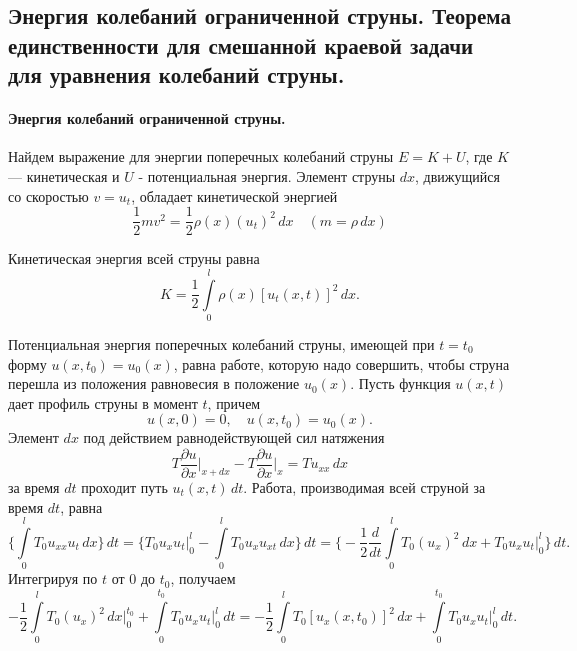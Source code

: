 \subsection{Энергия колебаний ограниченной струны. Теорема единственности для смешанной краевой задачи для уравнения колебаний струны.}

\paragraph{Энергия колебаний ограниченной струны.}

Найдем выражение для энергии поперечных колебаний струны $E = K + U$, где $K$ --- кинетическая и $U$ - потенциальная энергия. Элемент струны $dx$, движущийся со скоростью $v = u_t$, обладает кинетической энергией 
\begin{equation*}
	\frac{1}{2} m v^2 = \frac{1}{2} \rho(x) (u_t)^2 \, dx \quad (m = \rho \, dx)
\end{equation*}

Кинетическая энергия всей струны равна 
\begin{equation}
	K = \frac{1}{2} \int \limits_{0}^{l} \rho(x) [u_t(x, t)]^2 \, dx.
\end{equation}

Потенциальная энергия поперечных колебаний струны, имеющей при $t = t_0$ форму $u(x, t_0) = u_0(x)$, равна работе, которую надо совершить, чтобы струна перешла из положения равновесия в положение $u_0(x)$. Пусть функция $u(x, t)$ дает профиль струны в момент $t$, причем
\begin{equation*}
	u(x, 0) = 0, \quad u(x, t_0) = u_0(x).
\end{equation*}
Элемент $dx$ под действием равнодействующей сил натяжения 
\begin{equation*}
	T \frac{\partial u}{\partial x} \Big|_{x + dx} - T \frac{\partial u}{\partial x} \Big|_{x} = T u_{xx} \, dx
\end{equation*}
за время $dt$ проходит путь $u_t(x, t) \, dt$. Работа, производимая всей струной за время $dt$, равна
\begin{equation*}
	\Bigg\{\int \limits_{0}^{l} T_0 u_{xx} u_t \, dx \Bigg\} \, dt = \Bigg\{T_0 u_x u_t \Big|_{0}^{l} - \int \limits_{0}^{l} T_0 u_x u_{xt} \, dx \Bigg\} \, dt =  \Bigg\{-\frac{1}{2} \frac{d}{dt} \int \limits_{0}^{l} T_0 (u_x)^2 \, dx + T_0 u_x u_t \Big|_{0}^{l}\Bigg\} \, dt.
\end{equation*}
Интегрируя по $t$ от $0$ до $t_0$, получаем
\begin{equation*}
	-\frac{1}{2} \int \limits_{0}^{l} T_0(u_x)^2 \, dx \Big|_{0}^{t_0} + \int \limits_{0}^{t_0} T_0 u_x u_t \Big|_{0}^{l} \, dt = -\frac{1}{2} \int \limits_{0}^{l} T_0 [u_x(x, t_0)]^2 \, dx + \int \limits_{0}^{t_0} T_0 u_x u_t \Big|_{0}^{l} \, dt.
\end{equation*}

